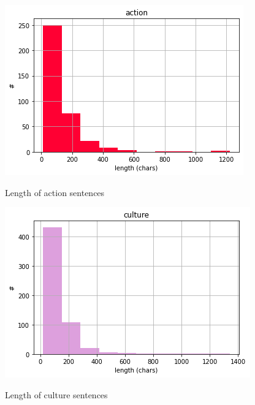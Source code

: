 \documentclass[11pt,letterpaper]{article}
\begin{document}
\begin{figure}[hbt!]
  \centering
  \begin{minipage}[b]{0.45\textwidth}
    \includegraphics[width=\textwidth]{images/len_act.png}
    \label{fig:len_act}
    \caption{Length of action sentences}
  \end{minipage}
  \hfill
  \begin{minipage}[b]{0.45\textwidth}
    \includegraphics[width=\textwidth]{images/len_cult.png}
    \label{fig:len_cult}
    \caption{Length of culture sentences}
  \end{minipage}
\end{figure}


\end{document}
